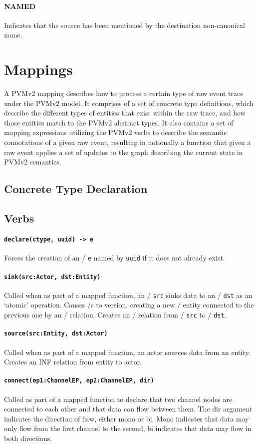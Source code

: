 \documentclass[12pt,twoside,a4paper]{article}
\newcommand{\field}[1]{\texttt{#1}}
\newcommand{\para}[1]{\paragraph{#1\\}}
\begin{document}
\para{NAMED}
\label{sec:gs:rel:named}
Indicates that the source has been mentioned by the destination non-canonical name.

\section{Mappings}
\label{sec:map}
A PVMv2 mapping describes how to process a certain type of raw event trace under the PVMv2 model. It comprises of a set of concrete type definitions, which describe the different types of entities that exist within the raw trace, and how those entities match to the PVMv2 abstract types. It also contains a set of mapping expressions utilizing the PVMv2 verbs to describe the semantic connotations of a given raw event, resulting in notionally a function that given a raw event applies a set of updates to the graph describing the current state in PVMv2 semantics.

\subsection{Concrete Type Declaration}
\label{sec:map:tydef}

\subsection{Verbs}
\label{sec:map:verbs}

\para{\texttt{declare(ctype, uuid) -> e}}
\label{sec:map:verbs:declare}
Forces the creation of an \Entity/ \field{e} named by \field{uuid} if it does not already exist.

\para{\texttt{sink(src:Actor, dst:Entity)}}
\label{sec:map:verbs:sink}
Called when as part of a mapped function, an \Actor/ \field{src} sinks data to an \Entity/ \field{dst} as an ‘atomic’ operation.
Causes \Store/s to version, creating a new \Store/ entity connected to the previous one by an \INF/ relation.
Creates an \INF/ relation from \Actor/ \field{src} to \Entity/ \field{dst}. 

\para{\texttt{source(src:Entity, dst:Actor)}}
\label{sec:map:verbs:source}
Called when as part of a mapped function, an actor sources data from an entity.
Creates an INF relation from entity to actor.

\para{\texttt{connect(ep1:ChannelEP, ep2:ChannelEP, dir)}}
\label{sec:map:verbs:connect}
Called as part of a mapped function to declare that two channel nodes are connected to each other and that data can flow between them. The dir argument indicates the direction of flow, either mono or bi. Mono indicates that data may only flow from the first channel to the second, bi indicates that data may flow in both directions. 
\end{document}
